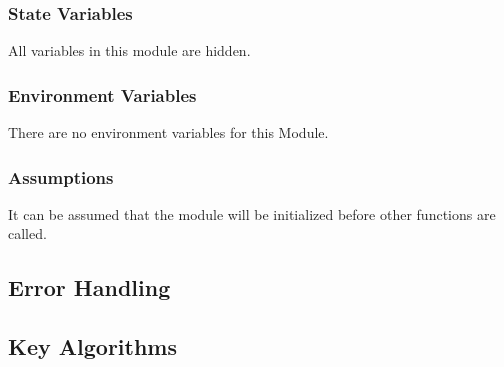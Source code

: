 \documentclass[12pt]{article}
\begin{document}
\subsubsection{State Variables}%
All variables in this module are hidden.

\subsubsection{Environment Variables}%
There are no environment variables for this Module.

\subsubsection{Assumptions}%
It can be assumed that the module will be initialized before other functions are called.

\subsection{Error Handling}

\subsection{Key Algorithms}
\end{document}
